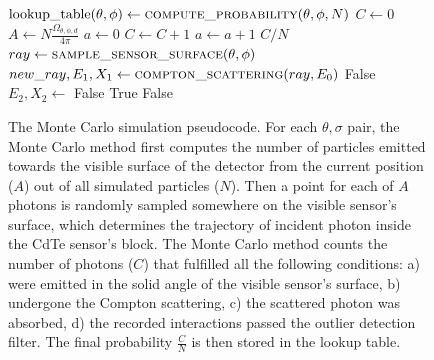 
  \begin{figure}
\begin{algorithmic}
      \State $\mathrm{lookup\_table}(\theta, \phi) \gets \Call{compute\_probability}{\theta, \phi, N}$
    \EndFor
  \EndFor
\EndFunction
\Statex
{}
\State $C \gets 0$
\State $A \gets N\frac{\Omega_{\theta, \phi, d}}{4 \pi}$ 
\State $a \gets 0$
   
  \State $C \gets C + 1 $ 
  \EndIf
  \State $a \gets a + 1$
\EndWhile
  \State \Return $C/N$ 
  \EndFunction
\Statex
  \State $ray \gets \Call{sample\_sensor\_surface}{\theta,\phi}$ 
   
  \State $new\_ray, E_{1}, X_{1} \gets \Call{compton\_scattering}{ray, E_{0}}$ %
  \Else{}
    \State \Return False 
  \EndIf
    
    \State $E_{2}, X_{2} \gets $
  \Else{}
    \State \Return False
  \EndIf
    
    \State \Return True   
    \Else{}
    \State \Return False
  \EndIf
\EndFunction
\end{algorithmic}
      \caption{The Monte Carlo simulation pseudocode. For each $\theta, \sigma$ pair, the Monte Carlo method first computes the number of particles emitted towards the visible surface of the detector from the current position ($A$) out of all simulated particles ($N$). 
    Then a point for each of $A$ photons is randomly sampled somewhere on the visible sensor's surface, which determines the trajectory of incident photon inside the \ac{CdTe} sensor's block. 
    The Monte Carlo method counts the number of photons ($C$) that fulfilled all the following conditions: a) were emitted in the solid angle of the visible sensor's surface, 
    b) undergone the Compton scattering, 
    c) the scattered photon was absorbed, 
    d) the recorded interactions passed the outlier detection filter.
    The final probability $\frac{C}{N}$ is then stored in the lookup table.}
\label{alg:monte}
\end{figure}
\newpage
